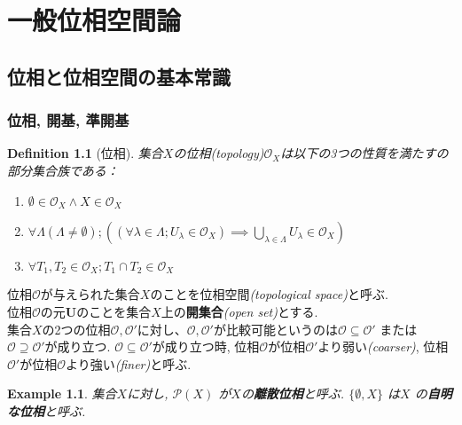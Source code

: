 \documentclass[lualatex]{ltjsbook}
\newtheorem{definition}[theorem]{Definition}
\theoremstyle{remark}
\theoremstyle{plain}
\newtheorem{example}[theorem]{Example}
\begin{document}
\part{一般位相空間論}


\chapter{位相と位相空間の基本常識}

\section{位相, 開基,  準開基}



\begin{definition}[位相]
	集合$X$の位相\textit{(topology)}$\mathcal{O}_X$は以下の3つの性質を満たすの部分集合族である：

	\begin{enumerate}
		\item $\emptyset \in \mathcal{O}_X \land X \in \mathcal{O}_X$
		\item $\forall \Lambda\left( \Lambda \neq \emptyset \right) ;\left( \left( \forall \lambda \in \Lambda; U_{\lambda} \in \mathcal{O}_X \right) \implies \bigcup_{\lambda \in \Lambda} U_{\lambda} \in \mathcal{O}_X \right) $ 
		\item $\forall T_1,  T_2 \in \mathcal{O}_X; T_1\cap T_2 \in \mathcal{O}_X$
	\end{enumerate}

\end{definition}


位相$\mathcal{O}$が与えられた集合$X$のことを位相空間\textit{(topological space)}と呼ぶ.\\
位相$\mathcal{O}$の元$\mathbf{U}$のことを集合$X$上の\textbf{開集合}\textit{(open set)}とする.\\
集合$X$の2つの位相$\mathcal{O}, \mathcal{O}'$に対し、$\mathcal{O}, \mathcal{O}'$が比較可能というのは$\mathcal{O} \subseteq \mathcal{O}' $ または$ \mathcal{O} \supseteq \mathcal{O}'$が成り立つ.
$\mathcal{O} \subseteq \mathcal{O}'$が成り立つ時,  位相$\mathcal{O}$が位相$\mathcal{O}'$より弱い\textit{(coarser)}, 位相$\mathcal{O}'$が位相$\mathcal{O}$より強い\textit{(finer)}と呼ぶ.


\begin{example}
	集合$X$に対し,  $\mathcal{P}\left( X \right) $ が$X$の\textbf{離散位相}と呼ぶ. $\{\emptyset ,  X\} $ は$X$ の\textbf{自明な位相}と呼ぶ.
\end{example}
\end{document}
